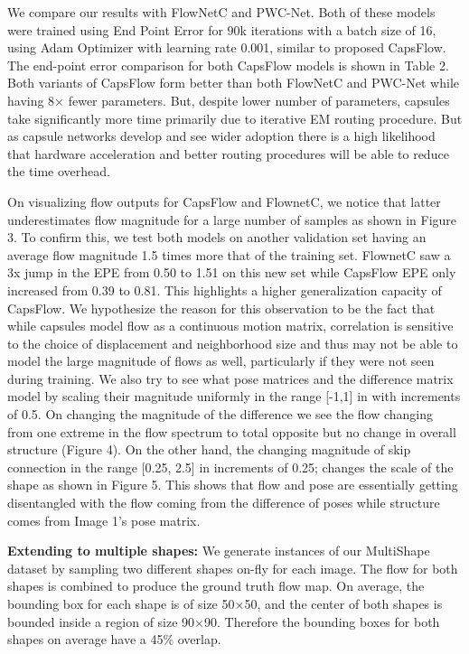 \documentclass[11pt]{article}
\begin{document}
We compare our results with FlowNetC and PWC-Net.
Both of these models were trained using End Point Error
for 90k iterations with a batch size of 16, using Adam Optimizer with learning rate 0.001, similar to proposed CapsFlow. The end-point error comparison for both CapsFlow
models is shown in Table 2. Both variants of CapsFlow form better than both FlowNetC and PWC-Net while having
8× fewer parameters. But, despite lower number of parameters, capsules take significantly more time primarily due to
iterative EM routing procedure. But as capsule networks develop and see wider adoption there is a high likelihood that
hardware acceleration and better routing procedures will be
able to reduce the time overhead.



On visualizing flow outputs for CapsFlow and FlownetC,
we notice that latter underestimates flow magnitude for a
large number of samples as shown in Figure 3. To confirm
this, we test both models on another validation set having
an average flow magnitude 1.5 times more that of the training set.  FlownetC saw a 3x jump in the EPE from 0.50 to
1.51 on this new set while CapsFlow EPE only increased
from 0.39 to 0.81. This highlights a higher generalization
capacity of CapsFlow. We hypothesize the reason for this
observation to be the fact that while capsules model flow
as a continuous motion matrix, correlation is sensitive to
the choice of displacement and neighborhood size and thus
may not be able to model the large magnitude of flows as
well, particularly if they were not seen during training. We also try to see what pose matrices and the difference
matrix model by scaling their magnitude uniformly in the
range [-1,1] in with increments of 0.5. On changing the
magnitude of the difference we see the flow changing from
one extreme in the flow spectrum to total opposite but no
change in overall structure (Figure 4). On the other hand,
the changing magnitude of skip connection in the range
[0.25, 2.5] in increments of 0.25; changes the scale of the
shape as shown in Figure 5. This shows that flow and pose 
are essentially getting disentangled with the flow coming from the difference of poses while structure comes from Image 1’s pose matrix.

\textbf{Extending to multiple shapes:} We generate instances
of our MultiShape dataset by sampling two different shapes
on-fly for each image. The flow for both shapes is combined to produce the ground truth flow map. On average, the
bounding box for each shape is of size 50×50, and the center of both shapes is bounded inside a region of size 90×90.
Therefore the bounding boxes for both shapes on average
have a 45\% overlap.
\end{document}
